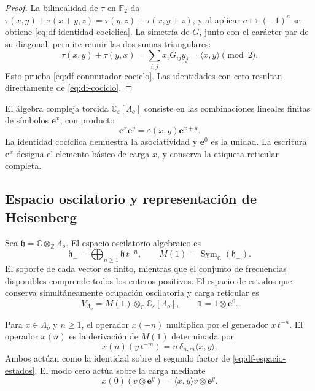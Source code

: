 \begin{proof}
La bilinealidad de \(\tau\) en \(\mathbb F_2\) da
\(\tau(x,y)+\tau(x+y,z)=\tau(y,z)+\tau(x,y+z)\), y al aplicar
\(a\mapsto(-1)^a\) se obtiene \eqref{eq:df-identidad-cociclica}.
La simetría de \(G\), junto con el carácter par de su diagonal, permite
reunir las dos sumas triangulares:
\[
 \tau(x,y)+\tau(y,x)
 =\sum_{i,j}x_iG_{ij}y_j
 =\langle x,y\rangle\pmod2.
\]
Esto prueba \eqref{eq:df-conmutador-cociclo}. Las identidades con cero
resultan directamente de \eqref{eq:df-cociclo}.
\end{proof}

El álgebra compleja torcida \(\mathbb C_{\varepsilon}[\Lambda_o]\)
consiste en las combinaciones lineales finitas de símbolos
\(\mathbf e^x\), con producto
\begin{equation}
 \mathbf e^x\mathbf e^y=\varepsilon(x,y)\mathbf e^{x+y}.
 \label{eq:df-producto-torcido}
\end{equation}
La identidad cocíclica demuestra la asociatividad y
\(\mathbf e^0\) es la unidad. La escritura \(\mathbf e^x\) designa el
elemento básico de carga \(x\), y conserva la etiqueta reticular completa.

\subsection{Espacio oscilatorio y representación de Heisenberg}
\label{subsec:df-osciladores}


Sea \(\mathfrak h=\mathbb C\otimes_{\mathbb Z}\Lambda_o\). El espacio
oscilatorio algebraico es
\[
 \mathfrak h_-=
 \bigoplus_{n\geq1}\mathfrak h\,t^{-n},
 \qquad
 M(1)=\operatorname{Sym}_{\mathbb C}(\mathfrak h_-).
\]
El soporte de cada vector es finito, mientras que el conjunto de frecuencias
disponibles comprende todos los enteros positivos. El espacio de estados
que conserva simultáneamente ocupación oscilatoria y carga reticular es
\begin{equation}
 V_{\Lambda_o}=M(1)\otimes_{\mathbb C}
                  \mathbb C_{\varepsilon}[\Lambda_o],
 \qquad \mathbf1=1\otimes\mathbf e^0.
 \label{eq:df-espacio-estados}
\end{equation}

Para \(x\in\Lambda_o\) y \(n\geq1\), el operador \(x(-n)\) multiplica
por el generador \(x\,t^{-n}\). El operador \(x(n)\) es la derivación
de \(M(1)\) determinada por
\begin{equation}
 x(n)(y\,t^{-m})=n\,\delta_{n,m}\langle x,y\rangle.
 \label{eq:df-derivacion-oscilatoria}
\end{equation}
Ambos actúan como la identidad sobre el segundo factor de
\eqref{eq:df-espacio-estados}. El modo cero actúa sobre la carga mediante
\[
 x(0)(v\otimes\mathbf e^y)
 =\langle x,y\rangle v\otimes\mathbf e^y.
\]

